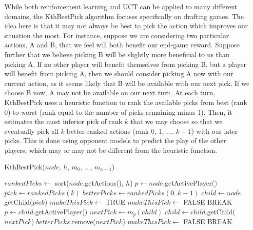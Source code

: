 \documentclass[letterpaper]{article}
\numberwithin{equation}{section}
\numberwithin{theorem}{section}
\numberwithin{lemma}{section}
\numberwithin{df}{section}
\begin{document}
While both reinforcement learning and UCT can be applied to many different domains, the KthBestPick algorithm focuses specifically on drafting games.  The idea here is that it may not always be best to pick the action which improves our situation the most.  For instance, suppose we are considering two particular actions, A and B, that we feel will both benefit our end-game reward.  Suppose further that we believe picking B will be slightly more beneficial to us than picking A.  If no other player will benefit themselves from picking B, but a player will benefit from picking A, then we should consider picking A now with our current action, as it seems likely that B will be available with our next pick.  If we choose B now, A may not be available on our next turn.  At each turn, KthBestPick uses a heuristic function to rank the available picks from best (rank 0) to worst (rank equal to the number of picks remaining minus 1).  Then, it estimates the most inferior pick of rank $k$ that we may choose so that we eventually pick all $k$ better-ranked actions (rank 0, 1, ..., $k-1$) with our later picks.  This is done using opponent models to predict the play of the other players, which may or may not be different from the heuristic function.

\begin{algorithm}
	\caption{KthBestPick($node$, $h$, $m_0$, ..., $m_{n-1}$)}
	\label{alg:kth}
	\begin{algorithmic}[1]
		\STATE $rankedPicks \gets $ sort($node$.getActions(), $h$)
		\STATE $p \gets node$.getActivePlayer()
			\STATE $pick \gets rankedPicks(k)$
			\STATE $betterPicks \gets rankedPicks(0..k-1)$
			\STATE $child \gets node.$getChild($pick$)
			\STATE $makeThisPick \gets $ TRUE
					\STATE $makeThisPick \gets $ FALSE
					\STATE BREAK
				\ENDIF
				\STATE $p \gets child$.getActivePlayer()
				\STATE $nextPick \gets m_p(child)$
				\STATE $child \gets child.$getChild($nextPick$)
						\STATE $betterPicks.$remove($nextPick$)
					\ELSE
						\STATE $makeThisPick \gets $ FALSE
						\STATE BREAK
					\ENDIF
				\ENDIF
			\ENDWHILE
			\ENDIF
		\ENDFOR
	\end{algorithmic}
\end{algorithm}
\end{document}
